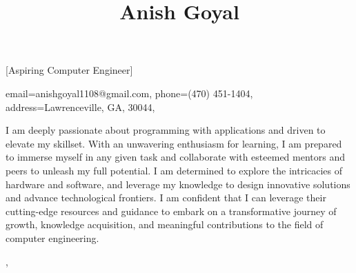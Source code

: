 \documentclass[sidebar-width=2.25in, primary=slate]{clean-resume}
\begin{document}
  \begin{sidebar}
    
    \title{Anish Goyal}[Aspiring Computer Engineer]
    
    
    \contact
    {
      email={anishgoyal1108@gmail.com},
      phone=(470) 451-1404,
      address={Lawrenceville, GA, 30044},
    }
    
    
    I am deeply passionate about programming with applications and driven to elevate my skillset. With an unwavering enthusiasm for learning, I am prepared to immerse myself in any given task and collaborate with esteemed mentors and peers to unleash my full potential. I am determined to explore the intricacies of hardware and software, and leverage my knowledge to design innovative solutions and advance technological frontiers. I am confident that I can leverage their cutting-edge resources and guidance to embark on a transformative journey of growth, knowledge acquisition, and meaningful contributions to the field of computer engineering. 
  \end{sidebar}%
  \sep%
\end{document}
